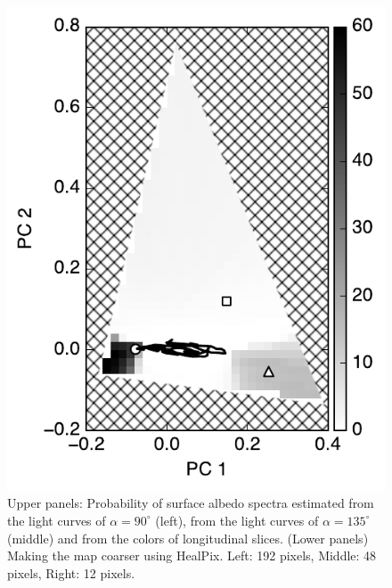\documentclass[iop,numberedappendix,apj]{emulateapj}
\begin{document}
\begin{figure}[tbh!]
\begin{minipage}{0.33\hsize}
\begin{center}
\includegraphics[width=\hsize]{IGBP_lon_noreg_allowedregion_gray.pdf}
    \end{center}
     \end{minipage}
    \caption{Upper panels: Probability of surface albedo spectra estimated from the light curves of $\alpha = 90^{\circ }$ (left), from the light curves of $\alpha = 135^{\circ }$ (middle) and from the colors of longitudinal slices. (Lower panels) Making the map coarser using HealPix. Left: 192 pixels, Middle: 48 pixels, Right: 12 pixels. }
\label{fig:PCplane}
\end{figure}
\end{document}
